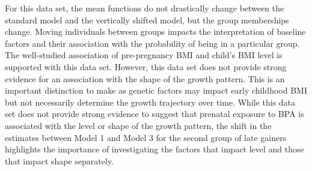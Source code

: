 For this data set, the mean functions do not drastically change between the standard model and the vertically shifted model, but the group memberships change. Moving individuals between groups impacts the interpretation of baseline factors and their association with the probability of being in a particular group. The well-studied association of pre-pregnancy BMI and child's BMI level \cite{whitaker1997} is supported with this data set. However, this data set does not provide strong evidence for an association with the shape of the growth pattern. This is an important distinction to make as genetic factors may impact early childhood BMI but not necessarily determine the growth trajectory over time. While this data set does not provide strong evidence to suggest that prenatal exposure to BPA is associated with the level or shape of the growth pattern, the shift in the estimates between Model 1 and Model 3 for the second group of late gainers highlights the importance of investigating the factors that impact level and those that impact shape separately.
